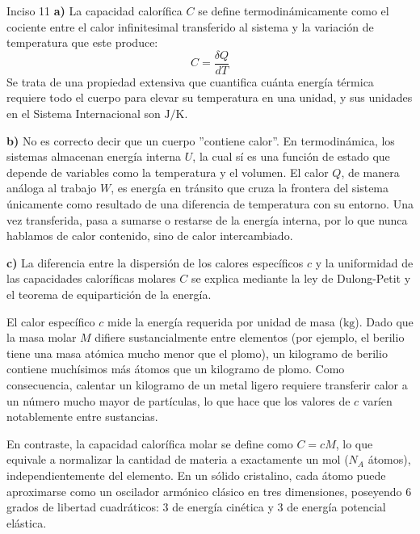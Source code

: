 \documentclass[11pt,letterpaper]{article}
\begin{document}
\begin{inciso}{Inciso 11}
\textbf{a)} La capacidad calorífica $C$ se define termodinámicamente como el cociente entre el calor infinitesimal transferido al sistema y la variación de temperatura que este produce:
\[
C = \frac{\delta Q}{dT}
\]
Se trata de una propiedad extensiva que cuantifica cuánta energía térmica requiere todo el cuerpo para elevar su temperatura en una unidad, y sus unidades en el Sistema Internacional son $\text{J/K}$.

\vspace{0.8em}
\textbf{b)} No es correcto decir que un cuerpo ''contiene calor''. En termodinámica, los sistemas almacenan energía interna $U$, la cual sí es una función de estado que depende de variables como la temperatura y el volumen. El calor $Q$, de manera análoga al trabajo $W$, es energía en tránsito que cruza la frontera del sistema únicamente como resultado de una diferencia de temperatura con su entorno. Una vez transferida, pasa a sumarse o restarse de la energía interna, por lo que nunca hablamos de calor contenido, sino de calor intercambiado.

\vspace{0.8em}
\textbf{c)} La diferencia entre la dispersión de los calores específicos $c$ y la uniformidad de las capacidades caloríficas molares $C$ se explica mediante la ley de Dulong-Petit y el teorema de equipartición de la energía.

El calor específico $c$ mide la energía requerida por unidad de masa ($\text{kg}$). Dado que la masa molar $M$ difiere sustancialmente entre elementos (por ejemplo, el berilio tiene una masa atómica mucho menor que el plomo), un kilogramo de berilio contiene muchísimos más átomos que un kilogramo de plomo. Como consecuencia, calentar un kilogramo de un metal ligero requiere transferir calor a un número mucho mayor de partículas, lo que hace que los valores de $c$ varíen notablemente entre sustancias.

En contraste, la capacidad calorífica molar se define como $C = cM$, lo que equivale a normalizar la cantidad de materia a exactamente un mol ($N_A$ átomos), independientemente del elemento. En un sólido cristalino, cada átomo puede aproximarse como un oscilador armónico clásico en tres dimensiones, poseyendo 6 grados de libertad cuadráticos: 3 de energía cinética y 3 de energía potencial elástica.


\end{inciso}
\end{document}
